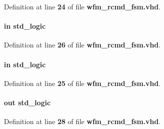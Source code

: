 Definition at line {\bf 24} of file {\bf wfm\+\_\+rcmd\+\_\+fsm.\+vhd}.

\paragraph[{rcmd\+\_\+rdy}]{ {\bfseries \textcolor{keywordflow}{in}\textcolor{vhdlchar}{ }} {\bfseries \textcolor{comment}{std\+\_\+logic}\textcolor{vhdlchar}{ }} \hspace{0.3cm}{\ttfamily [Port]}}\label{classwfm__rcmd__fsm_a7ceb3a2a34d06fe063a3974176cc5280}


Definition at line {\bf 26} of file {\bf wfm\+\_\+rcmd\+\_\+fsm.\+vhd}.

\paragraph[{rcmd\+\_\+reset\+\_\+n}]{ {\bfseries \textcolor{keywordflow}{in}\textcolor{vhdlchar}{ }} {\bfseries \textcolor{comment}{std\+\_\+logic}\textcolor{vhdlchar}{ }} \hspace{0.3cm}{\ttfamily [Port]}}\label{classwfm__rcmd__fsm_af69092233cc111b9f7592413282f334a}


Definition at line {\bf 25} of file {\bf wfm\+\_\+rcmd\+\_\+fsm.\+vhd}.

\paragraph[{rcmd\+\_\+wr}]{ {\bfseries \textcolor{keywordflow}{out}\textcolor{vhdlchar}{ }} {\bfseries \textcolor{comment}{std\+\_\+logic}\textcolor{vhdlchar}{ }} \hspace{0.3cm}{\ttfamily [Port]}}\label{classwfm__rcmd__fsm_a78c146778b35c788b7e41856e7e660a2}


Definition at line {\bf 28} of file {\bf wfm\+\_\+rcmd\+\_\+fsm.\+vhd}.

